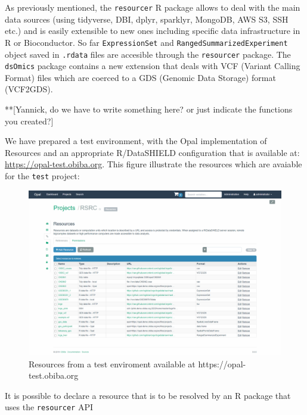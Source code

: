 \documentclass[]{article}
\begin{document}
As previously mentioned, the \texttt{resourcer} R package allows to deal
with the main data sources (using tidyverse, DBI, dplyr, sparklyr,
MongoDB, AWS S3, SSH etc.) and is easily extensible to new ones
including specific data infrastructure in R or Bioconductor. So far
\texttt{ExpressionSet} and \texttt{RangedSummarizedExperiment} object
saved in \texttt{.rdata} files are accesible through the
\texttt{resourcer} package. The \texttt{dsOmics} package contains a new
extension that deals with VCF (Variant Calling Format) files which are
coerced to a GDS (Genomic Data Storage) format (VCF2GDS).

**{[}Yannick, do we have to write something here? or just indicate the
functions you created?{]}

We have prepared a test environment, with the Opal implementation of
Resources and an appropriate R/DataSHIELD configuration that is
available at: \url{https://opal-test.obiba.org}. This figure illustrate
the resources which are avaiable for the \texttt{test} project:

\begin{figure}

{\centering \includegraphics[width=25in]{fig/opal_resources} 

}

\caption{Resources from a test enviroment available at https://opal-test.obiba.org}\label{fig:testResources}
\end{figure}

It is possible to declare a resource that is to be resolved by an R
package that uses the \texttt{resourcer} API
\end{document}
